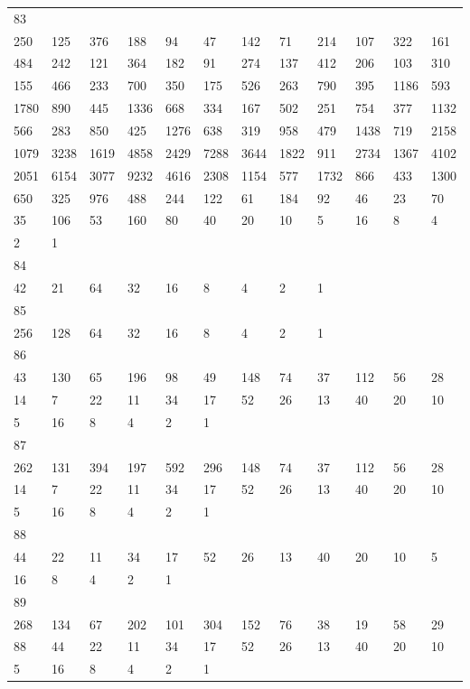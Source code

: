 \begin{longtable}{llllllllllll}
83&&&&&&&&&&&\\
250& 125& 376& 188& 94& 47& 142& 71& 214& 107& 322& 161\\
484& 242& 121& 364& 182& 91& 274& 137& 412& 206& 103& 310\\
155& 466& 233& 700& 350& 175& 526& 263& 790& 395& 1186& 593\\
1780& 890& 445& 1336& 668& 334& 167& 502& 251& 754& 377& 1132\\
566& 283& 850& 425& 1276& 638& 319& 958& 479& 1438& 719& 2158\\
1079& 3238& 1619& 4858& 2429& 7288& 3644& 1822& 911& 2734& 1367& 4102\\
2051& 6154& 3077& 9232& 4616& 2308& 1154& 577& 1732& 866& 433& 1300\\
650& 325& 976& 488& 244& 122& 61& 184& 92& 46& 23& 70\\
35& 106& 53& 160& 80& 40& 20& 10& 5& 16& 8& 4\\
2& 1& \\

84&&&&&&&&&&&\\
42& 21& 64& 32& 16& 8& 4& 2& 1& \\

85&&&&&&&&&&&\\
256& 128& 64& 32& 16& 8& 4& 2& 1& \\

86&&&&&&&&&&&\\
43& 130& 65& 196& 98& 49& 148& 74& 37& 112& 56& 28\\
14& 7& 22& 11& 34& 17& 52& 26& 13& 40& 20& 10\\
5& 16& 8& 4& 2& 1& \\

87&&&&&&&&&&&\\
262& 131& 394& 197& 592& 296& 148& 74& 37& 112& 56& 28\\
14& 7& 22& 11& 34& 17& 52& 26& 13& 40& 20& 10\\
5& 16& 8& 4& 2& 1& \\

88&&&&&&&&&&&\\
44& 22& 11& 34& 17& 52& 26& 13& 40& 20& 10& 5\\
16& 8& 4& 2& 1& \\

89&&&&&&&&&&&\\
268& 134& 67& 202& 101& 304& 152& 76& 38& 19& 58& 29\\
88& 44& 22& 11& 34& 17& 52& 26& 13& 40& 20& 10\\
5& 16& 8& 4& 2& 1& \\


\end{longtable}

